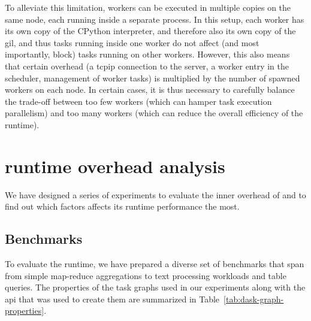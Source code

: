 To alleviate this limitation, \dask{} workers can be executed in multiple
copies on the same node, each running inside a separate process. In this setup, each worker has its
own copy of the CPython interpreter, and therefore also its own copy of the
\gls{gil}, and thus tasks running inside one worker do not affect (and most
importantly, block) tasks running on other workers. However, this also means that certain overhead
(a \gls{tcpip} connection to the server, a worker entry in the scheduler,
management of worker tasks) is multiplied by the number of spawned workers on each node. In certain
cases, it is thus necessary to carefully balance the trade-off between too few workers (which can
hamper task execution parallelism) and too many workers (which can reduce the overall efficiency of
the \dask{} runtime).

\section{\dask{} runtime overhead analysis}
\label{sec:rsds-dask-overhead-analysis}
We have designed a series of experiments to evaluate the inner overhead of
\dask{} and to find out which factors affects its runtime performance the most.

\subsection*{Benchmarks}
To evaluate the runtime, we have prepared a diverse set of benchmarks that span from simple
map-reduce aggregations to text processing workloads and table queries. The properties of the task
graphs used in our experiments along with the \dask{}
\gls{api} that was used to create them are summarized in
Table~\ref{tab:dask-graph-properties}.


